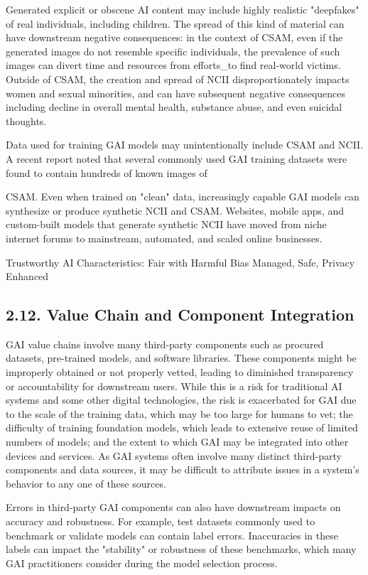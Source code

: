 \documentclass[10pt]{article}
\begin{document}
Generated explicit or obscene AI content may include highly realistic "deepfakes" of real individuals, including children. The spread of this kind of material can have downstream negative consequences: in the context of CSAM, even if the generated images do not resemble specific individuals, the prevalence of such images can divert time and resources from efforts\_to find real-world victims. Outside of CSAM, the creation and spread of NCII disproportionately impacts women and sexual minorities, and can have subsequent negative consequences including decline in overall mental health, substance abuse, and even suicidal thoughts.

Data used for training GAI models may unintentionally include CSAM and NCII. A recent report noted that several commonly used GAI training datasets were found to contain hundreds of known images of

CSAM. Even when trained on "clean" data, increasingly capable GAI models can synthesize or produce synthetic NCII and CSAM. Websites, mobile apps, and custom-built models that generate synthetic NCII have moved from niche internet forums to mainstream, automated, and scaled online businesses.

Trustworthy AI Characteristics: Fair with Harmful Bias Managed, Safe, Privacy Enhanced
\subsection*{2.12. Value Chain and Component Integration}
GAI value chains involve many third-party components such as procured datasets, pre-trained models, and software libraries. These components might be improperly obtained or not properly vetted, leading to diminished transparency or accountability for downstream users. While this is a risk for traditional AI systems and some other digital technologies, the risk is exacerbated for GAI due to the scale of the training data, which may be too large for humans to vet; the difficulty of training foundation models, which leads to extensive reuse of limited numbers of models; and the extent to which GAI may be integrated into other devices and services. As GAI systems often involve many distinct third-party components and data sources, it may be difficult to attribute issues in a system's behavior to any one of these sources.

Errors in third-party GAI components can also have downstream impacts on accuracy and robustness. For example, test datasets commonly used to benchmark or validate models can contain label errors. Inaccuracies in these labels can impact the "stability" or robustness of these benchmarks, which many GAI practitioners consider during the model selection process.
\end{document}
